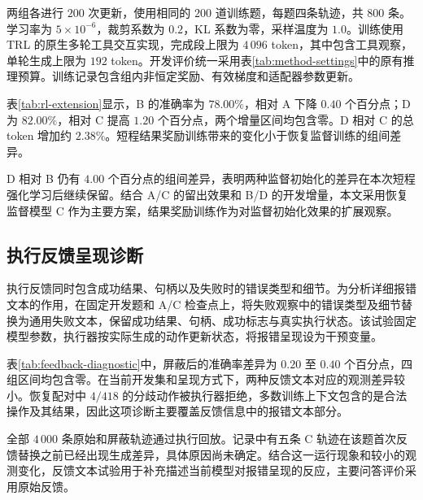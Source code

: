 两组各进行 $200$ 次更新，使用相同的 $200$ 道训练题，每题四条轨迹，共 $800$ 条。学习率为 $5\times10^{-6}$，裁剪系数为 $0.2$，KL 系数为零，采样温度为 $1.0$。训练使用 TRL 的原生多轮工具交互实现，完成段上限为 $4\,096$ token，其中包含工具观察，单轮生成上限为 $192$ token。开发评价统一采用表\ref{tab:method-settings}中的原有推理预算。训练记录包含组内非恒定奖励、有效梯度和适配器参数更新。

\begin{table}[htbp]
  \centering
  \caption{开发集强化学习扩展结果。B/D 分别由 $A_1$/$C_1$ 续训得到。}
  \label{tab:rl-extension}
  \PublicRLTable
\end{table}

表\ref{tab:rl-extension}显示，B 的准确率为 $78.00\%$，相对 A 下降 $0.40$ 个百分点；D 为 $82.00\%$，相对 C 提高 $1.20$ 个百分点，两个增量区间均包含零。D 相对 C 的总 token 增加约 $2.38\%$。短程结果奖励训练带来的变化小于恢复监督训练的组间差异。

D 相对 B 仍有 $4.00$ 个百分点的组间差异，表明两种监督初始化的差异在本次短程强化学习后继续保留。结合 A/C 的留出效果和 B/D 的开发增量，本文采用恢复监督模型 C 作为主要方案，结果奖励训练作为对监督初始化效果的扩展观察。

\subsection{执行反馈呈现诊断}

执行反馈同时包含成功结果、句柄以及失败时的错误类型和细节。为分析详细报错文本的作用，在固定开发题和 A/C 检查点上，将失败观察中的错误类型及细节替换为通用失败文本，保留成功结果、句柄、成功标志与真实执行状态。该试验固定模型参数，执行器按实际生成的动作更新状态，将报错呈现设为干预变量。

\begin{table}[htbp]
  \centering
  \caption{详细报错文本屏蔽结果；每组 $500$ 题，差值为屏蔽减原始}
  \label{tab:feedback-diagnostic}
  \PublicFeedbackTable
\end{table}

表\ref{tab:feedback-diagnostic}中，屏蔽后的准确率差异为 $0.20$ 至 $0.40$ 个百分点，四组区间均包含零。在当前开发集和呈现方式下，两种反馈文本对应的观测差异较小。恢复配对中 $4/418$ 的分歧动作被执行器拒绝，多数训练上下文包含的是合法操作及其结果，因此这项诊断主要覆盖反馈信息中的报错文本部分。

全部 $4\,000$ 条原始和屏蔽轨迹通过执行回放。记录中有五条 C 轨迹在该题首次反馈替换之前已经出现生成差异，具体原因尚未确定。结合这一运行现象和较小的观测变化，反馈文本试验用于补充描述当前模型对报错呈现的反应，主要问答评价采用原始反馈。

